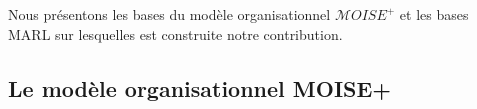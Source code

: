 \documentclass[contribution]{jfsma}
\begin{document}




Nous présentons les bases du modèle organisationnel $\mathcal{M}OISE^+$ et les bases MARL sur lesquelles est construite notre contribution.

\subsection{Le modèle organisationnel  MOISE+}


\end{document}
